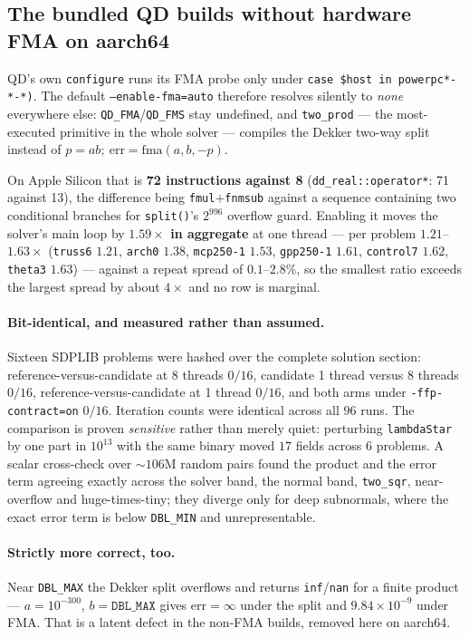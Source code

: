 \documentclass[11pt]{article}
\newcommand{\code}[1]{\texttt{#1}}
\begin{document}
\subsection{The bundled QD builds without hardware FMA on aarch64}
\label{sec:qdfma}

QD's own \code{configure} runs its FMA probe only under \code{case \$host in powerpc*-*-*)}. The
default \code{--enable-fma=auto} therefore resolves silently to \emph{none} everywhere else:
\code{QD\_FMA}/\code{QD\_FMS} stay undefined, and \code{two\_prod} --- the most-executed primitive
in the whole solver --- compiles the Dekker two-way split instead of
$p = a b;\ \mathrm{err} = \mathrm{fma}(a, b, -p)$.

On Apple Silicon that is \textbf{72 instructions against 8} (\code{dd\_real::operator*}: 71 against
13), the difference being \code{fmul}+\code{fnmsub} against a sequence containing two conditional
branches for \code{split()}'s $2^{996}$ overflow guard. Enabling it moves the solver's main loop by
\textbf{$1.59\times$ in aggregate} at one thread --- per problem $1.21$--$1.63\times$ (\code{truss6}
$1.21$, \code{arch0} $1.38$, \code{mcp250-1} $1.53$, \code{gpp250-1} $1.61$, \code{control7} $1.62$,
\code{theta3} $1.63$) --- against a repeat spread of $0.1$--$2.8\%$, so the smallest ratio exceeds
the largest spread by about $4\times$ and no row is marginal.

\paragraph{Bit-identical, and measured rather than assumed.} Sixteen SDPLIB problems were hashed
over the complete solution section: reference-versus-candidate at 8 threads $0/16$, candidate 1
thread versus 8 threads $0/16$, reference-versus-candidate at 1 thread $0/16$, and both arms under
\code{-ffp-contract=on} $0/16$. Iteration counts were identical across all $96$ runs. The comparison
is proven \emph{sensitive} rather than merely quiet: perturbing \code{lambdaStar} by one part in
$10^{13}$ with the same binary moved $17$ fields across $6$ problems. A scalar cross-check over
$\sim$$106$M random pairs found the product and the error term agreeing exactly across the solver
band, the normal band, \code{two\_sqr}, near-overflow and huge-times-tiny; they diverge only for
deep subnormals, where the exact error term is below \code{DBL\_MIN} and unrepresentable.

\paragraph{Strictly more correct, too.} Near \code{DBL\_MAX} the Dekker split overflows and returns
\code{inf}/\code{nan} for a finite product --- $a = 10^{-300}$, $b = \code{DBL\_MAX}$ gives
$\mathrm{err} = \infty$ under the split and $9.84\times10^{-9}$ under FMA. That is a latent defect
in the non-FMA builds, removed here on aarch64.
\end{document}
